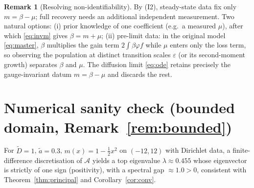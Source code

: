 \documentclass{amsart}
\theoremstyle{definition}
\newtheorem{remark}{Remark}
\begin{document}
\begin{remark}[Resolving non-identifiability]
By (I2), steady-state data fix only $m=\beta-\mu$; full recovery needs an additional
independent measurement. Two natural options: (i) prior knowledge of one coefficient (e.g.\ a
measured $\mu$), after which \eqref{eq:invm} gives $\beta=m+\mu$; (ii) pre-limit data: in the
original model \eqref{eq:master}, $\beta$ multiplies the gain term $2\int\beta\varphi f$ while
$\mu$ enters only the loss term, so observing the population at distinct transition scales
$\varepsilon$ (or its second-moment growth) separates $\beta$ and $\mu$. The diffusion limit
\eqref{eq:ode} retains precisely the gauge-invariant datum $m=\beta-\mu$ and discards the rest.
\end{remark}

\section*{Numerical sanity check (bounded domain, Remark~\ref{rem:bounded})}

For $\widetilde D=1$, $\widetilde a=0.3$, $m(x)=1-\tfrac12 x^2$ on $(-12,12)$ with Dirichlet
data, a finite-difference discretisation of $\mathcal A$ yields a top eigenvalue
$\lambda\approx0.455$ whose eigenvector is strictly of one sign (positivity), with a spectral
gap $\approx1.0>0$, consistent with Theorem~\ref{thm:principal} and Corollary~\ref{cor:conv}.
\end{document}
